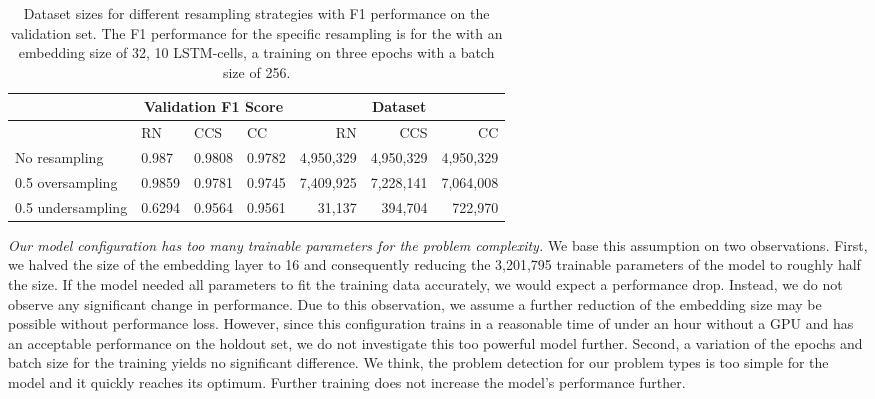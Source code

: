 \begin{table}[]
    \tabcolsep=0.11cm
    \begin{tabularx}{\textwidth}{lXXX|rrr}
    \toprule
                        & \multicolumn{3}{c}{Validation F1 Score} & \multicolumn{3}{c}{Dataset}   \\ \midrule
                        & RN        & CCS        & CC     & RN            & CCS         & CC          \\ \midrule
    No resampling     &  0.987   &  0.9808    &  0.9782  &  4,950,329    & 4,950,329   & 4,950,329   \\ \midrule
    0.5 oversampling  &  0.9859   &  0.9781   &  0.9745  &  7,409,925    & 7,228,141   & 7,064,008   \\
    0.5 undersampling &  0.6294   &  0.9564   &  0.9561  &  31,137       & 394,704     & 722,970     \\ \bottomrule
    \end{tabularx}
    \caption{Dataset sizes for different resampling strategies with F1 performance on the validation set. The F1 performance for the specific resampling is for the  with an embedding size of 32, 10 LSTM-cells, a training on three epochs with a batch size of 256.}
    \label{tab:resampling_size_performance_lstm}
\end{table}


\textit{Our model configuration has too many trainable parameters for the problem complexity.} We base this assumption on two observations. First, we halved the size of the embedding layer to 16 and consequently reducing the 3,201,795 trainable parameters of the model to roughly half the size. If the model needed all parameters to fit the training data accurately, we would expect a performance drop. Instead, we do not observe any significant change in performance. Due to this observation, we assume a further reduction of the embedding size may be possible without performance loss. However, since this configuration trains in a reasonable time of under an hour without a GPU and has an acceptable performance on the holdout set, we do not investigate this too powerful model further.
Second, a variation of the epochs and batch size for the training yields no significant difference. We think, the problem detection for our problem types is too simple for the model and it quickly reaches its optimum. Further training does not increase the model's performance further. 

\begin{center}
\end{center}

